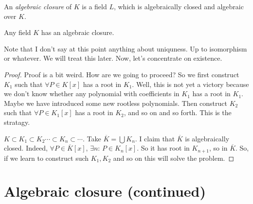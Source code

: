 \begin{definition}
An \textit{algebraic closure} of $K$ is a field $L$, which is algebraically closed and algebraic over $K$.
\end{definition}

\begin{theorem}
Any field $K$ has an algebraic closure.
\end{theorem}

Note that I don't say at this point anything about uniquness. Up to isomorphism or whatever. We will treat this later. Now, let's concentrate on existence. 

\begin{proof}
Proof is a bit weird. How are we going to proceed? So we first construct $K_1$ such that $\forall P \in K[x]$ has a root in $K_1$. Well, this is not yet a victory because we don't know whether any polynomial with coefficients in $K_1$ has a root in $K_1$. Maybe we have introduced some new rootless polynomials. Then construct $K_2$ such that $\forall P\in K_1[x]$ has a root in $K_2$, and so on and so forth. This is the stratagy. 

$K \subset K_1 \subset K_2 \cdots \subset K_n\subset\cdots$. Take $\overbar{K}=\bigcup K_n$. I claim that $\overbar{K}$ is algebraically closed. Indeed, $\forall P\in \overbar{K}[x]$, $\exists n$: $P\in K_n[x]$. So it has root in $K_{n+1}$, so in $\overbar{K}$. So, if we learn to construct such $K_1, K_2$ and so on this will solve the problem. 
\end{proof}


\section{Algebraic closure (continued)}

